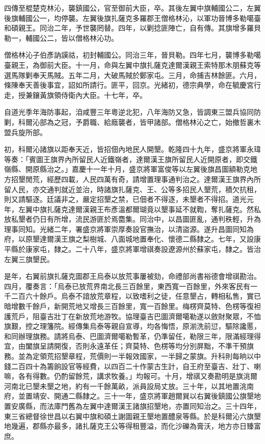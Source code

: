 \begin{pinyinscope}
四傳至棍楚克林沁，襲鎮國公，官至御前大臣，卒。其後左翼中旗輔國公二，左翼後旗輔國公一，均停襲。左翼後旗扎薩克多羅郡王僧格林沁，以軍功晉博多勒噶臺和碩親王。同治二年，予世襲罔替。四年，以剿捻匪陣亡，自有傳。其旗增多羅貝勒一，輔國公二，皆以僧格林沁功。

僧格林沁子伯彥訥謨祜，初封輔國公。同治三年，晉貝勒。四年七月，襲博多勒噶臺親王，為御前大臣。十一月，命與左翼中旗扎薩克達爾漢親王索特那木朋蘇克等選馬隊剿奉天馬賊。五年二月，大破馬賊於鄭家屯。三月，命捕吉林餘匪。六月，條陳奉天善後事宜，詔如所請行。匪平，回京。光緒初，德宗典學，命在毓慶宮行走，授兼鑲黃旗領侍衛內大臣。十七年，卒。

自道光季年海防事起，洎咸豐三年粵逆北犯，八年海防又急，皆調東三盟兵協同防剿，科爾沁部為之冠，予爵職、給廕襲者，皆甲諸部。僧格林沁之亡，始撤哲裏木盟兵旋所部。

初，科爾沁諸旗以距奉天近，皆招佃內地民人開墾。乾隆四十九年，盛京將軍永瑋等奏：「賓圖王旗界內所留民人近鐵嶺者，達爾漢王旗所留民人近開原者，即交鐵嶺縣、開原縣治之。」嘉慶十一年十月，盛京將軍富俊等以左翼後旗昌圖額勒克地方招墾閒荒，經歷四載，人民四萬有奇，請增置理事通判治之。達爾漢王旗界內所留人民，亦交通判就近並治，時諸旗扎薩克、王、公等多招民人墾荒，積欠抗租，則又請驅逐。廷議非之，嚴定招墾之禁，已佃者不得逐，未墾者不得招。道光元年，左翼中旗扎薩克達爾漢親王布彥溫都爾瑚竟以墾事延不就鞫，奪扎薩克。然私放私墾者仍日有所增，流民游匪於焉麕集。同治中，以昌圖匪亂，通判秩輕，升為理事同知。光緒二年，署盛京將軍崇厚奏設官撫治，以清盜源。遂升昌圖同知為府，以原墾達爾漢王旗之梨樹城、八面城地置奉化、懷德二縣隸之。七年，又設康平縣於康家屯，隸之。二十八年，盛京將軍增祺奏設遼源州於蘇家屯，隸之。皆治左翼三旗墾民。

是年，右翼前旗扎薩克圖郡王烏泰以放荒事屢被劾，命禮部尚書裕德會增祺勘治。四月，覆奏言：「烏泰已放荒界南北長三百餘里，東西寬一百餘里，外來客民有一千二百六十餘戶。烏泰不諳放荒章程，以致嗜利之徒，任意墾占，轉相私售，實已暗增數千餘戶，新開荒地又增長三百餘里，寬一百餘里。梅楞齊莫特、色楞等復袒護荒戶，阻臺吉壯丁在新放荒地游牧。協理臺吉巴圖濟爾噶勒遂以斂財聚眾，不恤旗艱，控之理籓院。經傳集烏泰等親自宣導，均各悔悟，原湔洗前愆，驅除讒慝，和同辦理旗務。請將烏泰、巴圖濟爾噶勒暫革，仍準留任，勒限三年，限滿經理得宜，由闔旗呈請開復，否則永遠革任；齊莫特、色楞等均分別屏黜，不準干預旗務。並為定領荒招墾章程，荒價則一半報效國家，一半歸之蒙旗。升科則每晌以中錢二百四十為籌餉設官等經費，以四百二十作蒙古生計，自王府至臺吉、壯丁、喇嘛，各有得數。仍酌留餘荒，講求牧養。」均報可。十月，增祺又奏勘明是旗洮爾河南北已墾未墾之地，約有一千餘萬畝，派員設局丈放。三十年，以其地置洮南府，並置靖安、開通二縣隸之。三十一年，盛京將軍趙爾巽以右翼後鎮國公旗墾地置安廣縣，而法庫門舊為左翼中達爾漢王諸旗招墾地，亦置同知治之。三十四年，東三省總督徐世昌以右翼中旗和碩土謝圖親王墾地置醴泉等縣。於是科爾沁六旗墾地幾遍，郡縣亦最多，諸扎薩克王公等得租豐溢，而化沙礫為膏沃，地方亦日臻富庶。


\end{pinyinscope}
